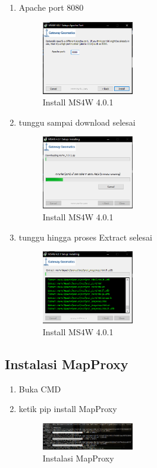 \begin{enumerate}
    \item Apache port 8080
    \hfill\break
    \begin{figure}[H]
		\includegraphics[width=4cm]{figures/tugas4/1174067/4.png}
		\centering
		\caption{Install MS4W 4.0.1}
    \end{figure}
    \hfill\break

    \item tunggu sampai download selesai
    \hfill\break
    \begin{figure}[H]
		\includegraphics[width=4cm]{figures/tugas4/1174067/5.png}
		\centering
		\caption{Install MS4W 4.0.1}
    \end{figure}
    \hfill\break

    \item tunggu hingga proses Extract selesai
    \hfill\break
    \begin{figure}[H]
		\includegraphics[width=4cm]{figures/tugas4/1174067/6.png}
		\centering
		\caption{Install MS4W 4.0.1}
    \end{figure}
    \hfill\break

\end{enumerate}

\subsection{Instalasi MapProxy}
\begin{enumerate}
  \item Buka CMD
  \item ketik pip install MapProxy
  \hfill\break
  \begin{figure}[H]
  \includegraphics[width=4cm]{figures/tugas4/1174067/9.png}
  \centering
  \caption{Instalasi MapProxy}
  \end{figure}
\end{enumerate}

